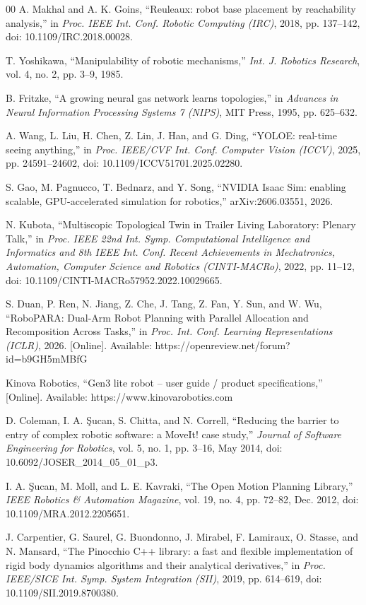\documentclass[conference]{IEEEtran}
\begin{document}
{\begin{thebibliography}{00}
A. Makhal and A. K. Goins, ``Reuleaux: robot base placement by reachability analysis,'' in \textit{Proc. IEEE Int. Conf. Robotic Computing (IRC)}, 2018, pp. 137--142, doi: 10.1109/IRC.2018.00028.

T. Yoshikawa, ``Manipulability of robotic mechanisms,'' \textit{Int. J. Robotics Research}, vol. 4, no. 2, pp. 3--9, 1985.

B. Fritzke, ``A growing neural gas network learns topologies,'' in \textit{Advances in Neural Information Processing Systems 7 (NIPS)}, MIT Press, 1995, pp. 625--632.

A. Wang, L. Liu, H. Chen, Z. Lin, J. Han, and G. Ding, ``YOLOE: real-time seeing anything,'' in \textit{Proc. IEEE/CVF Int. Conf. Computer Vision (ICCV)}, 2025, pp. 24591--24602, doi: 10.1109/ICCV51701.2025.02280.

S. Gao, M. Pagnucco, T. Bednarz, and Y. Song, ``NVIDIA Isaac Sim: enabling scalable, GPU-accelerated simulation for robotics,'' arXiv:2606.03551, 2026.

N. Kubota, ``Multiscopic Topological Twin in Trailer Living Laboratory: Plenary Talk,'' in \textit{Proc. IEEE 22nd Int. Symp. Computational Intelligence and Informatics and 8th IEEE Int. Conf. Recent Achievements in Mechatronics, Automation, Computer Science and Robotics (CINTI-MACRo)}, 2022, pp. 11--12, doi: 10.1109/CINTI-MACRo57952.2022.10029665.

S. Duan, P. Ren, N. Jiang, Z. Che, J. Tang, Z. Fan, Y. Sun, and W. Wu, ``RoboPARA: Dual-Arm Robot Planning with Parallel Allocation and Recomposition Across Tasks,'' in \textit{Proc. Int. Conf. Learning Representations (ICLR)}, 2026. [Online]. Available: https://openreview.net/forum?id=b9GH5mMBfG

Kinova Robotics, ``Gen3 lite robot -- user guide / product specifications,'' [Online]. Available: https://www.kinovarobotics.com

D. Coleman, I. A. {\c{S}}ucan, S. Chitta, and N. Correll, ``Reducing the barrier to entry of complex robotic software: a MoveIt! case study,'' \textit{Journal of Software Engineering for Robotics}, vol. 5, no. 1, pp. 3--16, May 2014, doi: 10.6092/JOSER\_2014\_05\_01\_p3.

I. A. {\c{S}}ucan, M. Moll, and L. E. Kavraki, ``The Open Motion Planning Library,'' \textit{IEEE Robotics \& Automation Magazine}, vol. 19, no. 4, pp. 72--82, Dec. 2012, doi: 10.1109/MRA.2012.2205651.

J. Carpentier, G. Saurel, G. Buondonno, J. Mirabel, F. Lamiraux, O. Stasse, and N. Mansard, ``The Pinocchio C++ library: a fast and flexible implementation of rigid body dynamics algorithms and their analytical derivatives,'' in \textit{Proc. IEEE/SICE Int. Symp. System Integration (SII)}, 2019, pp. 614--619, doi: 10.1109/SII.2019.8700380.

\end{thebibliography}
}
\end{document}
